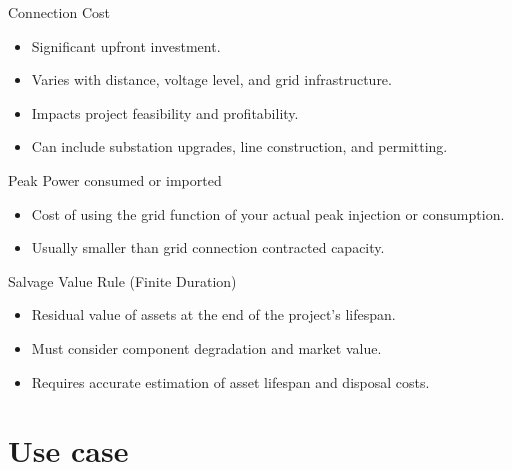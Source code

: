 \begin{frame}{Connection Cost}
  \begin{itemize}
    \item Significant upfront investment.
    \item Varies with distance, voltage level, and grid infrastructure.
    \item Impacts project feasibility and profitability.
    \item Can include substation upgrades, line construction, and permitting.
  \end{itemize}
\end{frame}

\begin{frame}{Peak Power consumed or imported}
  \begin{itemize}
    \item Cost of using the grid function of your actual peak injection or consumption.
    \item Usually smaller than grid connection contracted capacity.
  \end{itemize}
\end{frame}

\begin{frame}{Salvage Value Rule (Finite Duration)}
  \begin{itemize}
    \item Residual value of assets at the end of the project's lifespan.
    \item Must consider component degradation and market value.
    \item Requires accurate estimation of asset lifespan and disposal costs.
  \end{itemize}
\end{frame}

\section{Use case}

